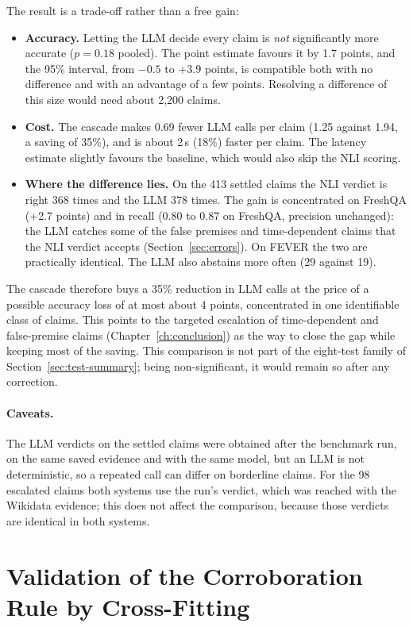 The result is a trade-off rather than a free gain:
\begin{itemize}[itemsep=0.3em]
  \item \textbf{Accuracy.} Letting the LLM decide every claim is \emph{not} significantly more accurate ($p = 0.18$ pooled). The point estimate favours it by 1.7 points, and the 95\% interval, from $-0.5$ to $+3.9$ points, is compatible both with no difference and with an advantage of a few points. Resolving a difference of this size would need about 2{,}200 claims.
  \item \textbf{Cost.} The cascade makes 0.69 fewer LLM calls per claim (1.25 against 1.94, a saving of 35\%), and is about 2\,s (18\%) faster per claim. The latency estimate slightly favours the baseline, which would also skip the NLI scoring.
  \item \textbf{Where the difference lies.} On the 413 settled claims the NLI verdict is right 368 times and the LLM 378 times. The gain is concentrated on FreshQA (+2.7 points) and in recall (0.80 to 0.87 on FreshQA, precision unchanged): the LLM catches some of the false premises and time-dependent claims that the NLI verdict accepts (Section~\ref{sec:errors}). On FEVER the two are practically identical. The LLM also abstains more often (29 \Unk{} against 19).
\end{itemize}
The cascade therefore buys a 35\% reduction in LLM calls at the price of a possible accuracy loss of at most about 4 points, concentrated in one identifiable class of claims. This points to the targeted escalation of time-dependent and false-premise claims (Chapter~\ref{ch:conclusion}) as the way to close the gap while keeping most of the saving. This comparison is not part of the eight-test family of Section~\ref{sec:test-summary}; being non-significant, it would remain so after any correction.

\paragraph{Caveats.} The LLM verdicts on the settled claims were obtained after the benchmark run, on the same saved evidence and with the same model, but an LLM is not deterministic, so a repeated call can differ on borderline claims. For the 98 escalated claims both systems use the run's verdict, which was reached with the Wikidata evidence; this does not affect the comparison, because those verdicts are identical in both systems.

\section{Validation of the Corroboration Rule by Cross-Fitting}
\label{sec:crossfit-results}

